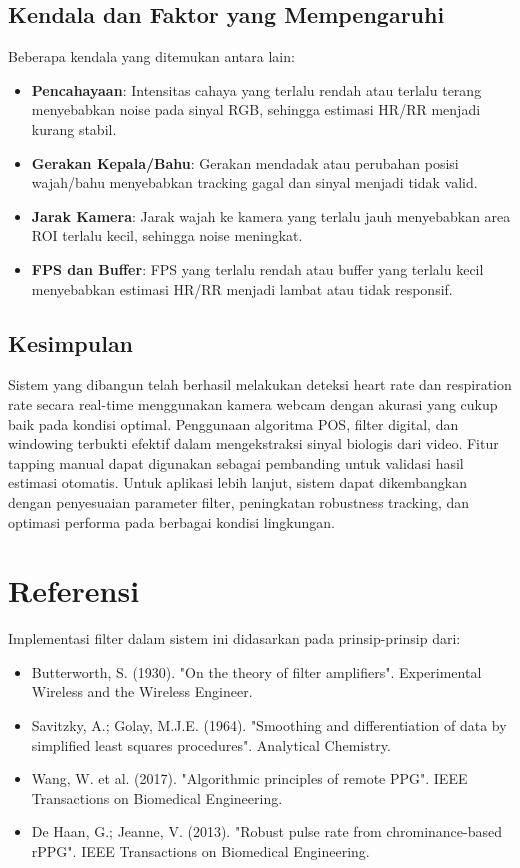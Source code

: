 \documentclass[11pt,a4paper]{article}
\begin{document}
\subsection{Kendala dan Faktor yang Mempengaruhi}
Beberapa kendala yang ditemukan antara lain:
\begin{itemize}
    \item \textbf{Pencahayaan}: Intensitas cahaya yang terlalu rendah atau terlalu terang menyebabkan noise pada sinyal RGB, sehingga estimasi HR/RR menjadi kurang stabil.
    \item \textbf{Gerakan Kepala/Bahu}: Gerakan mendadak atau perubahan posisi wajah/bahu menyebabkan tracking gagal dan sinyal menjadi tidak valid.
    \item \textbf{Jarak Kamera}: Jarak wajah ke kamera yang terlalu jauh menyebabkan area ROI terlalu kecil, sehingga noise meningkat.
    \item \textbf{FPS dan Buffer}: FPS yang terlalu rendah atau buffer yang terlalu kecil menyebabkan estimasi HR/RR menjadi lambat atau tidak responsif.
\end{itemize}

\subsection{Kesimpulan}
Sistem yang dibangun telah berhasil melakukan deteksi heart rate dan respiration rate secara real-time menggunakan kamera webcam dengan akurasi yang cukup baik pada kondisi optimal. Penggunaan algoritma POS, filter digital, dan windowing terbukti efektif dalam mengekstraksi sinyal biologis dari video. Fitur tapping manual dapat digunakan sebagai pembanding untuk validasi hasil estimasi otomatis. Untuk aplikasi lebih lanjut, sistem dapat dikembangkan dengan penyesuaian parameter filter, peningkatan robustness tracking, dan optimasi performa pada berbagai kondisi lingkungan.




\section{Referensi}
Implementasi filter dalam sistem ini didasarkan pada prinsip-prinsip dari:
\begin{itemize}
    \item Butterworth, S. (1930). "On the theory of filter amplifiers". Experimental Wireless and the Wireless Engineer.
    \item Savitzky, A.; Golay, M.J.E. (1964). "Smoothing and differentiation of data by simplified least squares procedures". Analytical Chemistry.
    \item Wang, W. et al. (2017). "Algorithmic principles of remote PPG". IEEE Transactions on Biomedical Engineering.
    \item De Haan, G.; Jeanne, V. (2013). "Robust pulse rate from chrominance-based rPPG". IEEE Transactions on Biomedical Engineering.
\end{itemize}
\end{document}
